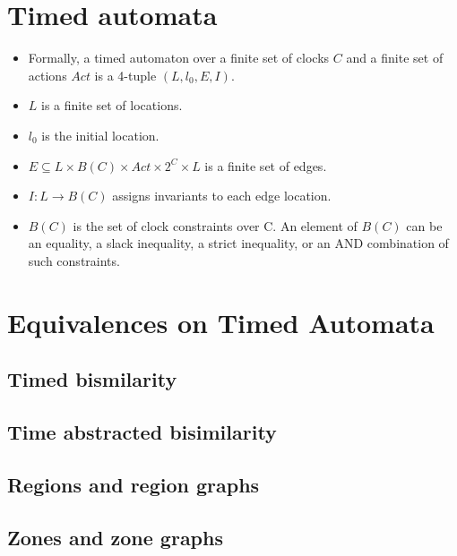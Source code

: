 \documentclass{article}
\begin{document}
\section{Timed automata}

  \begin{itemize}
  \item Formally, a timed automaton over a finite set of clocks $C$
    and a finite set of actions $Act$ is a 4-tuple $(L, l_{0}, E, I)$.
  \item $L$ is a finite set of locations.
  \item $l_{0}$ is the initial location.
  \item $E \subseteq L \times B(C) \times Act \times 2^{C} \times L$
    is a finite set of edges.
  \item $I: L \rightarrow B(C)$ assigns invariants to each edge
    location.
  \item $B(C)$ is the set of clock constraints over C. An element of $B(C)$
    can be an equality, a slack inequality, a strict inequality, or
    an AND combination of such constraints.
  \end{itemize}

\section{Equivalences on Timed Automata}

\subsection{Timed bismilarity}



\subsection{Time abstracted bisimilarity}

\subsection{Regions and region graphs}

\subsection{Zones and zone graphs}
\end{document}
